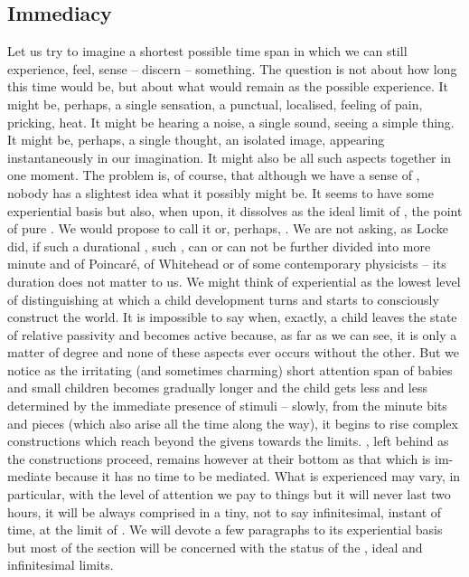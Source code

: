 \subsection{Immediacy}\label{sec:levelA}
\pa\label{pa:horizonImmediacy} Let us try to imagine a shortest possible time
span in which we can still experience, feel, sense -- discern -- something. The
question is not about how long this time would be, but about what would remain
as the possible experience.  It might be, perhaps, a single sensation, a
punctual, localised, feeling of pain, pricking, heat. It might be hearing a
noise, a single sound, seeing a simple thing. It might be, perhaps, a single
thought, an isolated image, appearing instantaneously in our imagination. It
might also be all such aspects together in one moment. The problem is, of
course, that although we have a sense of , nobody has a
slightest idea what it possibly might be. It seems to have some experiential
basis but also, when  upon, it dissolves as the ideal limit of
, the point of pure .  We would propose to call it  or, perhaps, .  We are not asking, as Locke
did, if such a durational , such , can or can not be further divided into
more minute and   of Poincar\'{e},
 of Whitehead or  of some contemporary
physicists -- its
 duration does not matter to us. We might think of
experiential  as the lowest level of distinguishing at which a child
development turns and starts to consciously construct the world. It is
impossible to say when, exactly, a child leaves the state of relative passivity
and becomes active because, as far as we can see, it is only a matter of degree
and none of these aspects ever occurs without the other. But we notice as the
irritating (and sometimes charming) short attention span of babies and small
children becomes gradually longer and the child gets less and less determined by
the immediate presence of stimuli -- slowly, from the minute bits and pieces
(which also arise all the time along the way), it begins to rise complex
constructions which reach beyond the  givens towards the
 limits.
, left behind as the constructions proceed, remains however at
their bottom as that which is im-mediate because it has no time to be
mediated. What is experienced  may vary, in particular, with the
level of attention we pay to things but it will never last two hours, it will be
always comprised in a tiny, not to say infinitesimal, instant of time, at the
limit of .  We will devote a few paragraphs to its experiential
basis but most of the section will be concerned with the status of the
, ideal and infinitesimal limits.

